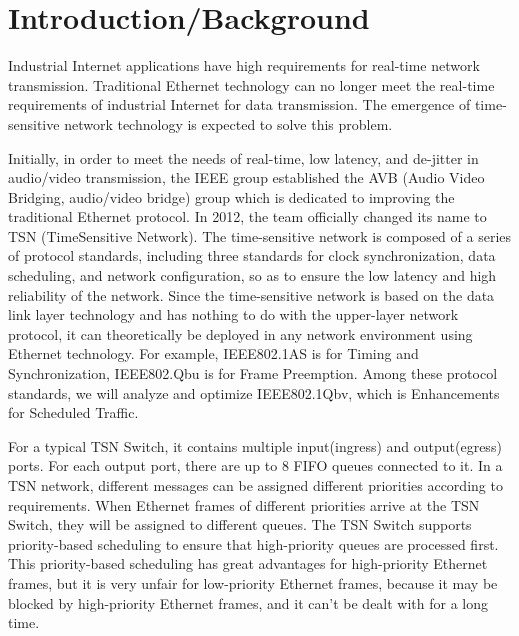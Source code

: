 \documentclass[conference]{IEEEtran}
\begin{document}
\section{Introduction/Background
} \label{introduction}


Industrial Internet applications have high requirements for real-time network transmission. Traditional Ethernet technology can no longer meet the real-time requirements of industrial Internet for data transmission. The emergence of time-sensitive network technology is expected to solve this problem.
 
Initially, in order to meet the needs of real-time, low latency, and de-jitter in audio/video transmission, the IEEE group established the AVB (Audio Video Bridging, audio/video bridge) group which is dedicated to improving the traditional Ethernet protocol. In 2012, the team officially changed its name to TSN (TimeSensitive Network). The time-sensitive network is composed of a series of protocol standards, including three standards for clock synchronization, data scheduling, and network configuration, so as to ensure the low latency and high reliability of the network. Since the time-sensitive network is based on the data link layer technology and has nothing to do with the upper-layer network protocol, it can theoretically be deployed in any network environment using Ethernet technology. For example, IEEE802.1AS is for Timing and Synchronization, IEEE802.Qbu is for Frame Preemption. Among these protocol standards, we will analyze and optimize IEEE802.1Qbv, which is Enhancements for Scheduled Traffic. 

For a typical TSN Switch, it contains multiple input(ingress) and output(egress) ports. For each output port, there are up to 8 FIFO queues connected to it. In a TSN network, different messages can be assigned different priorities according to requirements. When Ethernet frames of different priorities arrive at the TSN Switch, they will be assigned to different queues. The TSN Switch supports priority-based scheduling to ensure that high-priority queues are processed first. This priority-based scheduling has great advantages for high-priority Ethernet frames, but it is very unfair for low-priority Ethernet frames, because it may be blocked by high-priority Ethernet frames, and it can’t be dealt with for a long time. 
\end{document}
